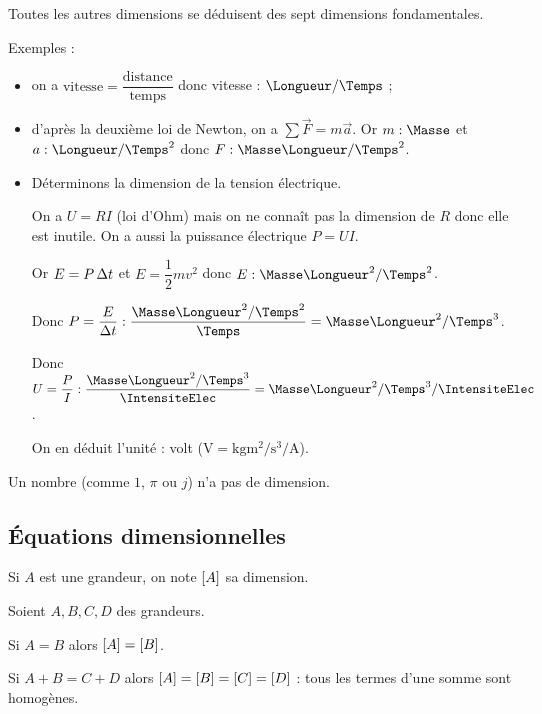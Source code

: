 Toutes les autres dimensions se déduisent des sept dimensions fondamentales.

Exemples : \begin{itemize}
\item on a \(\text{vitesse}=\dfrac{\text{distance}}{\text{temps}}\) donc vitesse : \(\unit{\Longueur\per\Temps}\) ; \\

\item d'après la deuxième loi de Newton, on a \(\sum\vec{F}=m\vec{a}\). Or \(m:\unit{\Masse}\) et \(a:\unit{\Longueur\per\Temps\squared}\) donc \(F:\unit{\Masse\Longueur\per\Temps\squared}\). \\

\item Déterminons la dimension de la tension électrique.

On a \(U=RI\) (loi d'Ohm) mais on ne connaît pas la dimension de \(R\) donc elle est inutile. On a aussi la puissance électrique \(P=UI\).

Or \(E=P\adif{t}\) et \(E=\dfrac{1}{2}mv^2\) donc \(E:\unit{\Masse\Longueur\squared\per\Temps\squared}\).

Donc \(P=\dfrac{E}{\adif{t}}:\dfrac{\unit{\Masse\Longueur\squared\per\Temps\squared}}{\unit{\Temps}}=\unit{\Masse\Longueur\squared\per\Temps\cubed}\).

Donc \(U=\dfrac{P}{I}:\dfrac{\unit{\Masse\Longueur\squared\per\Temps\cubed}}{\unit{\IntensiteElec}}=\unit{\Masse\Longueur\squared\per\Temps\cubed\per\IntensiteElec}\).

On en déduit l'unité : volt (\(\unit{\volt}=\unit{\kilo\gram\meter\squared\per\second\cubed\per\ampere}\)). \\
\end{itemize}

Un nombre (comme \(1\), \(\pi\) ou \(j\)) n'a pas de dimension.

\subsection{Équations dimensionnelles}

Si \(A\) est une grandeur, on note \(\left[A\right]\) sa dimension.

Soient \(A,B,C,D\) des grandeurs.

Si \(A=B\) alors \(\left[A\right]=\left[B\right]\).

Si \(A+B=C+D\) alors \(\left[A\right]=\left[B\right]=\left[C\right]=\left[D\right]\) : tous les termes d'une somme sont homogènes.

